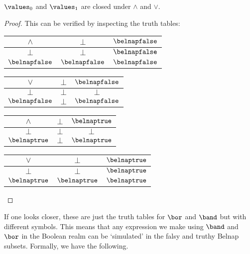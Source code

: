 \begin{lemma}
    \(\values_0\) and \(\values_1\) are closed under \(\land\) and \(\lor\).
\end{lemma}
\begin{proof}
    This can be verified by inspecting the truth tables:

    \vspace{0.5em}

    \begin{center}
        \begin{tabular}{c|cc}
            \(\land\)        & \(\bot\)         & \(\belnapfalse\) \\
            \hline
            \(\bot\)         & \(\bot\)         & \(\belnapfalse\) \\
            \(\belnapfalse\) & \(\belnapfalse\) & \(\belnapfalse\)
        \end{tabular}
        \quad
        \begin{tabular}{c|cc}
            \(\lor\)         & \(\bot\) & \(\belnapfalse\) \\
            \hline
            \(\bot\)         & \(\bot\) & \(\bot\)         \\
            \(\belnapfalse\) & \(\bot\) & \(\belnapfalse\)
        \end{tabular}
        \quad
        \begin{tabular}{c|cc}
            \(\land\)       & \(\bot\) & \(\belnaptrue\) \\
            \hline
            \(\bot\)        & \(\bot\) & \(\bot\)        \\
            \(\belnaptrue\) & \(\bot\) & \(\belnaptrue\)
        \end{tabular}
        \quad
        \begin{tabular}{c|cc}
            \(\lor\)        & \(\bot\)        & \(\belnaptrue\) \\
            \hline
            \(\bot\)        & \(\bot\)        & \(\belnaptrue\) \\
            \(\belnaptrue\) & \(\belnaptrue\) & \(\belnaptrue\)
        \end{tabular}
    \end{center}

    \qedhere
\end{proof}

If one looks closer, these are just the truth tables for \(\bor\) and \(\band\)
but with different symbols.
This means that any expression we make using \(\band\) and \(\bor\) in the
Boolean realm can be `simulated' in the falsy and truthy Belnap subsets.
Formally, we have the following.

